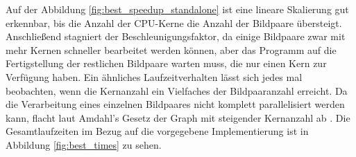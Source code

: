 Auf der Abbildung \ref{fig:best_speedup_standalone} ist eine lineare Skalierung gut erkennbar, bis die Anzahl der \gls{CPU}-Kerne die Anzahl der Bildpaare übersteigt. Anschließend stagniert der Beschleunigungsfaktor, da einige Bildpaare zwar mit mehr Kernen schneller bearbeitet werden können, aber das Programm auf die Fertigstellung der restlichen Bildpaare warten muss, die nur einen Kern zur Verfügung haben. Ein ähnliches Laufzeitverhalten lässt sich jedes mal beobachten, wenn die Kernanzahl ein Vielfaches der Bildpaaranzahl erreicht. Da die Verarbeitung eines einzelnen Bildpaares nicht komplett parallelisiert werden kann, flacht laut Amdahl's Gesetz der Graph mit steigender Kernanzahl ab \cite{Amd67}. Die Gesamtlaufzeiten im Bezug auf die vorgegebene Implementierung ist in Abbildung \ref{fig:best_times} zu sehen. 

